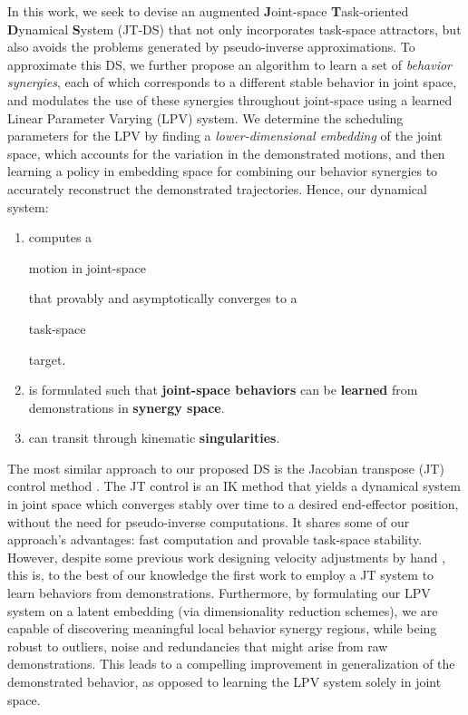 \documentclass[letterpaper, 10 pt, conference,fleqn]{ieeeconf}
\begin{document}
In this work, we seek to devise an augmented \textbf{J}oint-space \textbf{T}ask-oriented \textbf{D}ynamical \textbf{S}ystem (JT-DS) that not only incorporates task-space attractors, but also avoids the problems generated by pseudo-inverse approximations. To approximate this DS, we further propose an algorithm to learn a set of \emph{behavior synergies}, each of which corresponds to a different stable behavior in joint space, and modulates the use of these synergies throughout joint-space using a learned Linear Parameter Varying (LPV) system. We determine the scheduling parameters for the LPV by finding a \emph{lower-dimensional embedding} of the joint space, which accounts for the variation in the demonstrated motions, and then learning a policy in embedding space for combining our behavior synergies to accurately reconstruct the demonstrated trajectories. 
Hence, our dynamical system:
\begin{enumerate}[leftmargin=*]
\item computes a \begin{bf}motion in joint-space\end{bf} that provably and asymptotically converges to a \begin{bf}task-space \end{bf}target.
\item is formulated such that \textbf{joint-space behaviors} can be \textbf{learned} from demonstrations in \textbf{synergy space}.
\item can transit through kinematic \textbf{singularities}.
\end{enumerate}


The most similar approach to our proposed DS is the Jacobian transpose (JT) control method \cite{wolovich1984computational} . The JT control is an IK method that yields a dynamical system in joint space
which converges stably over time to a desired end-effector position, without the need for pseudo-inverse computations. It shares some of our approach's advantages: fast computation and provable task-space stability. However, despite some previous work designing velocity adjustments by hand \cite{Shi2016}, this is, to the best of our knowledge the first work to employ a JT system to learn behaviors from demonstrations. Furthermore, by formulating our LPV system on a latent embedding (via dimensionality reduction schemes), we are capable of discovering meaningful local behavior synergy regions, while being robust to outliers, noise and redundancies that might arise from raw demonstrations. This leads to a compelling improvement in generalization of the demonstrated behavior, as opposed to learning the LPV system solely in joint space. 
\end{document}
